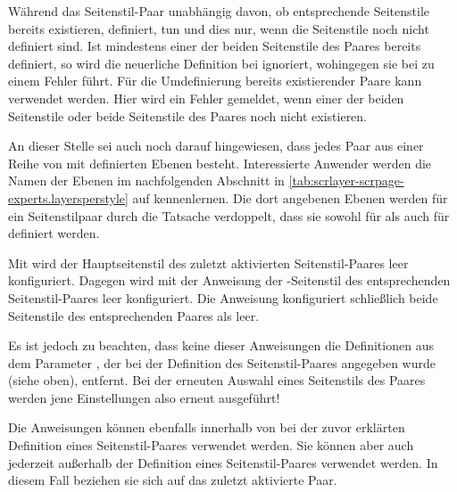 Während  das Seitenstil-Paar
unabhängig davon, ob entsprechende Seitenstile bereits existieren, definiert,
tun  und  dies nur,
wenn die Seitenstile noch nicht definiert sind. Ist mindestens einer der
beiden Seitenstile des Paares bereits definiert, so wird die neuerliche
Definition bei  ignoriert, wohingegen sie bei
 zu einem Fehler führt. Für die Umdefinierung
bereits existierender Paare kann  verwendet
werden. Hier wird ein Fehler gemeldet, wenn einer der beiden Seitenstile oder
beide Seitenstile des Paares noch nicht existieren.%

An dieser Stelle sei auch noch darauf hingewiesen, dass jedes Paar aus einer
Reihe von mit \hyperref[cha:scrlayer]{} definierten Ebenen
besteht. Interessierte Anwender werden die Namen der
Ebenen im nachfolgenden Abschnitt in
\autoref{tab:scrlayer-scrpage-experts.layersperstyle} auf
 kennenlernen. Die
dort angebenen Ebenen werden für ein Seitenstilpaar durch die Tatsache
verdoppelt, dass sie sowohl für  als auch
für  definiert werden.%
\EndIndexGroup


\begin{Declaration}
\end{Declaration}
Mit  wird der Hauptseitenstil des zuletzt
aktivierten Seitenstil-Paares leer konfiguriert. Dagegen wird mit der
Anweisung  der
-Seitenstil des entsprechenden Seitenstil-Paares leer
konfiguriert. Die Anweisung  konfiguriert
schließlich beide Seitenstile des entsprechenden Paares als leer.

Es ist jedoch zu beachten, dass keine dieser Anweisungen
die Definitionen aus dem Parameter , der bei der Definition
des Seitenstil-Paares angegeben wurde (siehe oben), entfernt. Bei der erneuten
Auswahl eines Seitenstils des Paares werden jene Einstellungen also erneut
ausgeführt!

Die Anweisungen können ebenfalls innerhalb von  bei der
zuvor erklärten Definition eines Seitenstil-Paares verwendet werden. Sie
können aber auch jederzeit außerhalb der Definition eines Seitenstil-Paares
verwendet werden. In diesem Fall beziehen sie sich auf das zuletzt aktivierte
Paar.%
\EndIndexGroup


